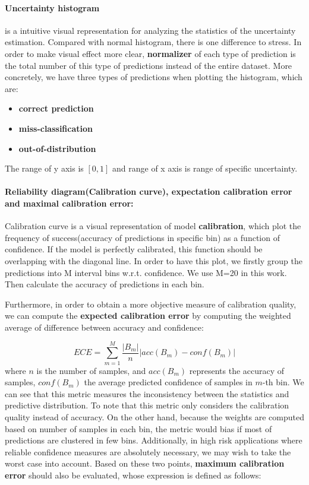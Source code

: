 \paragraph{Uncertainty histogram} is a intuitive visual representation for analyzing the statistics of the uncertainty estimation. Compared with normal histogram, there is one difference to stress. In order to make visual effect more clear, \textbf{normalizer} of each type of prediction is the total number of this type of predictions instead of the entire dataset. More concretely, we have three types of predictions when plotting the histogram, which are:
 \begin{itemize}
 	\item \textbf{correct prediction}
 	\item \textbf{miss-classification}
 	\item \textbf{out-of-distribution}
 \end{itemize}The range of y axis is $[0,1]$  and range of x axis is range of specific uncertainty.

\paragraph{Reliability diagram(Calibration curve), expectation calibration error and maximal calibration error:} Calibration curve is a visual representation of model \textbf{calibration}\cite{guo2017calibration}, which plot the frequency of success(accuracy of predictions in specific bin) as a function of confidence. If the model is perfectly calibrated, this function should be overlapping with the diagonal line. 
In order to have this plot, we firstly group the predictions into M interval bins w.r.t. confidence. We use M=20 in this work. Then calculate the accuracy of predictions in each bin.

Furthermore, in order to obtain a more objective measure of calibration quality, we can compute the \textbf{expected calibration error} by computing the weighted average of difference between accuracy and confidence:

\begin{equation}
ECE = \sum_{m=1}^{M}\frac{|B_m|}{n}|acc(B_m) - conf(B_m)|
\end{equation}
where $n$ is the number of samples, and $acc(B_m)$ represents the accuracy of samples, $conf(B_m)$ the average predicted confidence of samples in $m$-th bin. We can see that this metric measures the inconsistency between the statistics and predictive distribution. To note that this metric only considers the calibration quality instead of accuracy. On the other hand, because the weights are computed based on number of samples in each bin, the metric would bias if most of predictions are clustered in few bins. Additionally, in high risk applications where reliable confidence measures are absolutely necessary, we may wish to take the worst case into account. Based on these two points, \textbf{maximum calibration error} should also be evaluated, whose expression is defined as follows:

